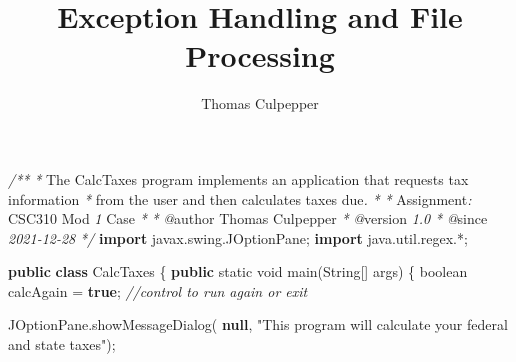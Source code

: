 \documentclass[\pandocDocMode,longtable, floatsintext, noextraspace]{apa6}
\title{Exception Handling and File Processing}
\author{Thomas Culpepper}
\affiliation{CSC310 Module 1 Case\\Trident University International}
\newenvironment{Shaded}{}{}
\newcommand{\BuiltInTok}[1]{#1}
\newcommand{\CommentTok}[1]{\textcolor[rgb]{0.38,0.63,0.69}{\textit{#1}}}
\newcommand{\DataTypeTok}[1]{\textcolor[rgb]{0.56,0.13,0.00}{#1}}
\newcommand{\FunctionTok}[1]{\textcolor[rgb]{0.02,0.16,0.49}{#1}}
\newcommand{\ImportTok}[1]{#1}
\newcommand{\KeywordTok}[1]{\textcolor[rgb]{0.00,0.44,0.13}{\textbf{#1}}}
\newcommand{\NormalTok}[1]{#1}
\newcommand{\OperatorTok}[1]{\textcolor[rgb]{0.40,0.40,0.40}{#1}}
\newcommand{\StringTok}[1]{\textcolor[rgb]{0.25,0.44,0.63}{#1}}
\begin{document}
\maketitle

\hypertarget{mycode}{%
\label{mycode}}%
\begin{Shaded}
\begin{Highlighting}[numbers=left,,firstnumber=100,]
 \CommentTok{/**}
\CommentTok{*}\NormalTok{ The CalcTaxes program implements an application that requests tax information }
\CommentTok{*}\NormalTok{ from the user and then calculates taxes due}\CommentTok{.}
\CommentTok{*}
\CommentTok{*}\NormalTok{ Assignment}\CommentTok{:}\NormalTok{ CSC310 Mod }\CommentTok{1}\NormalTok{ Case}
\CommentTok{*}
\CommentTok{*} \CommentTok{@}\NormalTok{author  Thomas Culpepper}
\CommentTok{*} \CommentTok{@}\NormalTok{version }\CommentTok{1.0}
\CommentTok{*} \CommentTok{@}\NormalTok{since   }\CommentTok{2021{-}12{-}28}
\CommentTok{*/}
\KeywordTok{import} \ImportTok{javax}\OperatorTok{.}\ImportTok{swing}\OperatorTok{.}\ImportTok{JOptionPane}\OperatorTok{;}
\KeywordTok{import} \ImportTok{java}\OperatorTok{.}\ImportTok{util}\OperatorTok{.}\ImportTok{regex}\OperatorTok{.*;}

\KeywordTok{public} \KeywordTok{class}\NormalTok{ CalcTaxes }\OperatorTok{\{}
    \KeywordTok{public} \DataTypeTok{static} \DataTypeTok{void} \FunctionTok{main}\OperatorTok{(}\BuiltInTok{String}\OperatorTok{[]}\NormalTok{ args}\OperatorTok{)} \OperatorTok{\{}
        \DataTypeTok{boolean}\NormalTok{ calcAgain }\OperatorTok{=} \KeywordTok{true}\OperatorTok{;} \CommentTok{//control to run again or exit}

        \BuiltInTok{JOptionPane}\OperatorTok{.}\FunctionTok{showMessageDialog}\OperatorTok{(}
            \KeywordTok{null}\OperatorTok{,} \StringTok{"This program will calculate your federal and state taxes"}\OperatorTok{);}


\end{Highlighting}
\end{Shaded}
\end{document}
